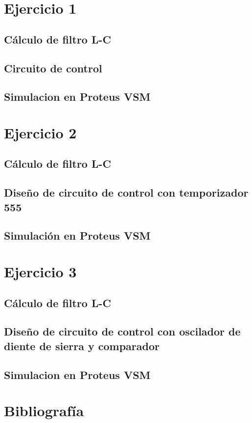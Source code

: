 \documentclass[11pt, a4paper, oneside]{article}
\begin{document}
\tableofcontents
\newpage

\renewcommand{\thesubsection}{\alph{subsection}}
\section{Ejercicio 1}
\subsection{Cálculo de filtro L-C}
\lipsum[1]
\subsection{Circuito de control}
\lipsum[1]
\subsection{Simulacion en Proteus VSM}
\lipsum[1]

\section{Ejercicio 2}
\subsection{Cálculo de filtro L-C}
\lipsum[1]
\subsection{Diseño de circuito de control con temporizador 555}
\lipsum[1]
\subsection{Simulación en Proteus VSM}
\lipsum[1]

\section{Ejercicio 3}
\subsection{Cálculo de filtro L-C}
\lipsum[1]
\subsection{Diseño de circuito de control con oscilador de diente de sierra y comparador}
\lipsum[1]
\subsection{Simulacion en Proteus VSM}
\lipsum[1]

\appendix
\section*{Bibliografía}
\end{document}
